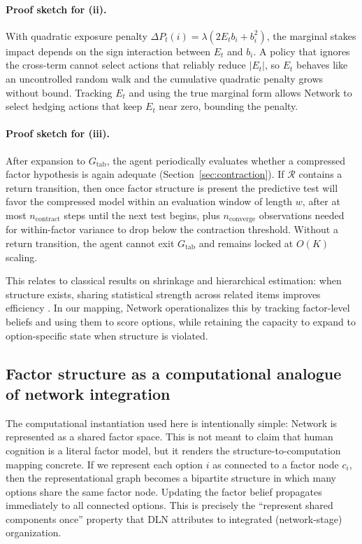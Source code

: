 \documentclass[11pt]{article}
\begin{document}
\paragraph{Proof sketch for (ii).}
With quadratic exposure penalty $\Delta P_t(i)=\lambda(2E_t b_i + b_i^2)$, the
marginal stakes impact depends on the sign interaction between $E_t$ and $b_i$.
A policy that ignores the cross-term cannot select actions that reliably reduce
$|E_t|$, so $E_t$ behaves like an uncontrolled random walk and the cumulative
quadratic penalty grows without bound.  Tracking $E_t$ and using the true
marginal form allows Network to select hedging actions that keep $E_t$ near
zero, bounding the penalty.

\paragraph{Proof sketch for (iii).}
After expansion to $G_{\mathrm{tab}}$, the agent periodically evaluates whether a
compressed factor hypothesis is again adequate (Section~\ref{sec:contraction}).
If $\mathcal{R}$ contains a return transition, then once factor structure is
present the predictive test will favor the compressed model within an evaluation
window of length $w$, after at most $n_{\mathrm{contract}}$ steps until the next
test begins, plus $n_{\mathrm{converge}}$ observations needed for within-factor
variance to drop below the contraction threshold.  Without a return transition,
the agent cannot exit $G_{\mathrm{tab}}$ and remains locked at $O(K)$ scaling.


This relates to classical results on shrinkage and hierarchical estimation: when structure exists, sharing statistical strength across related items improves efficiency \cite{JamesStein1961,EfronMorris1977}. In our mapping, Network operationalizes this by tracking factor-level beliefs and using them to score options, while retaining the capacity to expand to option-specific state when structure is violated.

\subsection{Factor structure as a computational analogue of network integration}

The computational instantiation used here is intentionally simple: Network is represented as a shared factor space. This is not meant to claim that human cognition is a literal factor model, but it renders the structure-to-computation mapping concrete. If we represent each option $i$ as connected to a factor node $c_i$, then the representational graph becomes a bipartite structure in which many options share the same factor node. Updating the factor belief propagates immediately to all connected options. This is precisely the ``represent shared components once'' property that DLN attributes to integrated (network-stage) organization.
\end{document}
